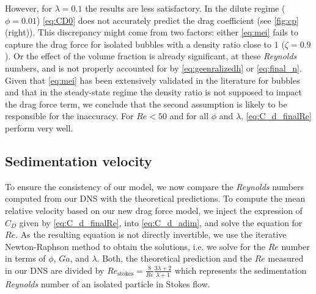 However, for $\lambda = 0.1$ the results are less satisfactory. 
In the dilute regime ($\phi = 0.01$) \ref{eq:CD0} does not accurately predict the drag coefficient (see \ref{fig:cp} (right)). 
This discrepancy might come from two factors: either \ref{eq:mei} fails to capture the drag force for isolated bubbles with a density ratio close to $1$  ($\zeta  = 0.9$).
Or the effect of the volume fraction is already significant, at these \textit{Reynolds} numbers, and is not properly accounted for by \ref{eq:geenralizedh} or \ref{eq:final_n}. 
Given that \ref{eq:mei} has been extensively validated in the literature for bubbles and that in the steady-state regime the density ratio is not supposed to impact the drag force term, we conclude that the second assumption is likely to be responsible for the inaccuracy. 
For $Re < 50$ and for all $\phi$ and $\lambda$,  \ref{eq:C_d_finalRe} perform very well. 


\subsection{Sedimentation velocity}



To ensure the consistency of our model, we now compare the \textit{Reynolds} numbers computed from our DNS with the theoretical predictions. 
To compute the mean relative velocity based on our new drag force model, we inject the expression of $C_D$ given by \ref{eq:C_d_finalRe}, into \ref{eq:C_d_adim}, and solve the equation for $Re$. 
As the resulting equation is not directly invertible, we use the iterative Newton-Raphson method to obtain the solutions, i.e. we solve for the $Re$ number in terms of $\phi$, $Ga$, and $\lambda$. 
Both, the theoretical prediction and the $Re$ measured in our DNS are divided by $Re_\text{stokes} = \frac{8}{Re} \frac{3\lambda +2}{\lambda+1}$ which represents the sedimentation \textit{Reynolds} number of an isolated particle in Stokes flow.  

